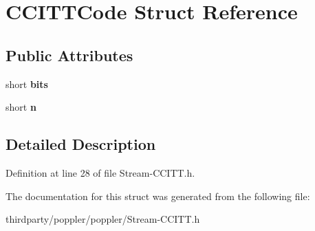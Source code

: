 \hypertarget{struct_c_c_i_t_t_code}{}\section{C\+C\+I\+T\+T\+Code Struct Reference}
\label{struct_c_c_i_t_t_code}
\subsection*{Public Attributes}
\begin{DoxyCompactItemize}
\item 
\mbox{\label{struct_c_c_i_t_t_code_a0205d4833a9a43adc0c7d19d2854a4fd}} 
short {\bfseries bits}
\item 
\mbox{\label{struct_c_c_i_t_t_code_ae5ee712be79547ed49e92387797536a7}} 
short {\bfseries n}
\end{DoxyCompactItemize}


\subsection{Detailed Description}


Definition at line 28 of file Stream-\/\+C\+C\+I\+T\+T.\+h.



The documentation for this struct was generated from the following file\+:\begin{DoxyCompactItemize}
\item 
thirdparty/poppler/poppler/Stream-\/\+C\+C\+I\+T\+T.\+h\end{DoxyCompactItemize}
